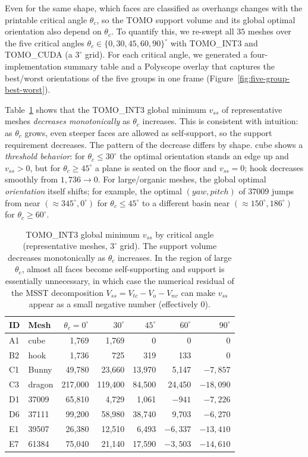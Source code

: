\documentclass[11pt,a4paper]{article}
\begin{document}
Even for the same shape, which faces are classified as overhangs changes with the printable critical angle $\theta_c$,
so the TOMO support volume and its global optimal orientation also depend on $\theta_c$.
To quantify this, we re-swept all $35$ meshes over the five critical angles $\theta_c\in\{0,30,45,60,90\}^\circ$
with TOMO\_INT3 and TOMO\_CUDA (a $3^\circ$ grid).
For each critical angle, we generated a four-implementation summary table and a Polyscope overlay that captures the best/worst orientations of the five groups in one frame
(Figure~\ref{fig:five-group-best-worst}).

Table~\ref{tab:critangle} shows that the TOMO\_INT3 global minimum $v_{ss}$ of representative meshes \emph{decreases monotonically} as $\theta_c$ increases.
This is consistent with intuition: as $\theta_c$ grows, even steeper faces are allowed as self-support, so the support requirement decreases.
The pattern of the decrease differs by shape.
cube shows a \emph{threshold behavior}: for $\theta_c\le30^\circ$ the optimal orientation stands an edge up and $v_{ss}>0$, but
for $\theta_c\ge45^\circ$ a plane is seated on the floor and $v_{ss}=0$;
hook decreases smoothly from $1{,}736\to0$.
For large/organic meshes, the global optimal \emph{orientation} itself shifts;
for example, the optimal $(yaw,pitch)$ of $37009$ jumps from near $(\approx\!345^\circ,0^\circ)$ for $\theta_c\le45^\circ$
to a different basin near $(\approx\!150^\circ,186^\circ)$ for $\theta_c\ge60^\circ$.

\begin{table}[H]
\footnotesize
\centering
\caption{TOMO\_INT3 global minimum $v_{ss}$ by critical angle (representative meshes, $3^\circ$ grid).
The support volume decreases monotonically as $\theta_c$ increases.
In the region of large $\theta_c$, almost all faces become self-supporting and support is essentially unnecessary,
in which case the numerical residual of the MSST decomposition $V_{ss}=V_{tc}-V_o-V_{nv}$ can make $v_{ss}$ appear as a small negative number (effectively $0$).}
\label{tab:critangle}
\begin{tabular}{llrrrrr}
\toprule
ID & Mesh & $\theta_c{=}0^\circ$ & $30^\circ$ & $45^\circ$ & $60^\circ$ & $90^\circ$\\
\midrule
A1 & cube   & 1{,}769   & 1{,}769   & 0        & 0         & 0\\
B2 & hook   & 1{,}736   & 725       & 319      & 133       & 0\\
C1 & Bunny  & 49{,}780  & 23{,}660  & 13{,}970 & 5{,}147   & $-7{,}857$\\
C3 & dragon & 217{,}000 & 119{,}400 & 84{,}500 & 24{,}450  & $-18{,}090$\\
D1 & 37009  & 65{,}810  & 4{,}729   & 1{,}061  & $-941$    & $-7{,}226$\\
D6 & 37111  & 99{,}200  & 58{,}980  & 38{,}740 & 9{,}703   & $-6{,}270$\\
E1 & 39507  & 26{,}380  & 12{,}510  & 6{,}493  & $-6{,}337$ & $-13{,}410$\\
E7 & 61384  & 75{,}040  & 21{,}140  & 17{,}590 & $-3{,}503$ & $-14{,}610$\\
\bottomrule
\end{tabular}
\end{table}
\end{document}
